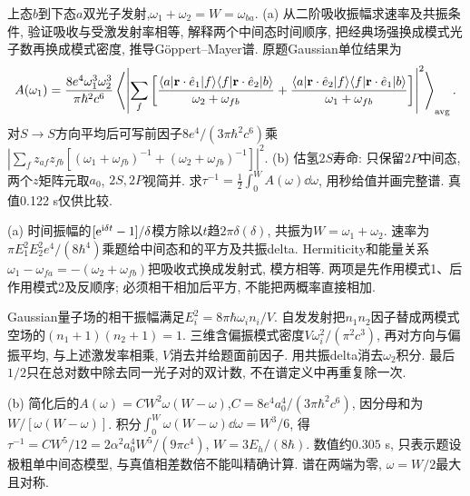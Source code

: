 \begin{exercise}上态$b$到下态$a$双光子发射,$\omega_1+\omega_2=W=\omega_{ba}$. (a) 从二阶吸收振幅求速率及共振条件, 验证吸收与受激发射率相等, 解释两个中间态时间顺序, 把经典场强换成模式光子数再换成模式密度, 推导Göppert--Mayer谱. 原题Gaussian单位结果为
\[A(\omega_1)=\frac{8e^4\omega_1^3\omega_2^3}{\pi\hbar^2c^6}\left\langle\left|\sum_f\left[\frac{\langle a|\mathbf r\cdot\hat e_1|f\rangle\langle f|\mathbf r\cdot\hat e_2|b\rangle}{\omega_2+\omega_{fb}}+\frac{\langle a|\mathbf r\cdot\hat e_2|f\rangle\langle f|\mathbf r\cdot\hat e_1|b\rangle}{\omega_1+\omega_{fb}}\right]\right|^2\right\rangle_{\rm avg}.\]
对$S\to S$方向平均后可写前因子$8e^4/(3\pi\hbar^2c^6)$乘$|\sum_fz_{af}z_{fb}[(\omega_1+\omega_{fb})^{-1}+(\omega_2+\omega_{fb})^{-1}]|^2$. (b) 估氢$2S$寿命: 只保留$2P$中间态, 两个$z$矩阵元取$a_0$, $2S,2P$视简并. 求$\tau^{-1}=\frac12\int_0^WA(\omega)\dd\omega$, 用秒给值并画完整谱. 真值0.122 s仅供比较.\end{exercise}
\begin{solution}(a) 时间振幅的$[\mathrm e^{\mathrm i\delta t}-1]/\delta$模方除以$t$趋$2\pi\delta(\delta)$, 共振为$W=\omega_1+\omega_2$. 速率为$\pi E_1^2E_2^2e^4/(8\hbar^4)$乘题给中间态和的平方及共振delta. Hermiticity和能量关系$\omega_1-\omega_{fa}=-(\omega_2+\omega_{fb})$把吸收式换成发射式, 模方相等. 两项是先作用模式1、后作用模式2及反顺序; 必须相干相加后平方, 不能把两概率直接相加.

Gaussian量子场的相干振幅满足$E_i^2=8\pi\hbar\omega_i n_i/V$. 自发发射把$n_1n_2$因子替成两模式空场的$(n_1+1)(n_2+1)=1$. 三维含偏振模式密度$V\omega_i^2/(\pi^2c^3)$, 再对方向与偏振平均, 与上述激发率相乘, $V$消去并给题面前因子. 用共振delta消去$\omega_2$积分. 最后$1/2$只在总对数中除去同一光子对的双计数, 不在谱定义中再重复除一次.

(b) 简化后的$A(\omega)=C W^2\omega(W-\omega)$,$C=8e^4a_0^4/(3\pi\hbar^2c^6)$, 因分母和为$W/[\omega(W-\omega)]$. 积分$\int_0^W\omega(W-\omega)\dd\omega=W^3/6$, 得$\tau^{-1}=CW^5/12=2\alpha^2a_0^4W^5/(9\pi c^4)$, $W=3E_h/(8\hbar)$. 数值约$0.305$ s, 只表示题设极粗单中间态模型, 与真值相差数倍不能叫精确计算. 谱在两端为零, $\omega=W/2$最大且对称.
\begin{center}\end{center}
\end{solution}
